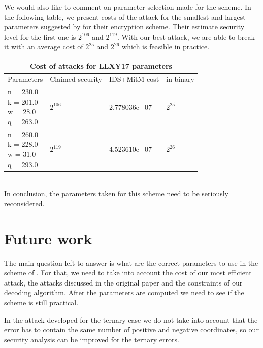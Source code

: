 \documentclass[12pt]{article}
\begin{document}
We would also like to comment on parameter selection made for the scheme. In the following table, we present costs of the attack for the smallest and largest parameters suggested by \cite{[LLXY17]} for their encryption scheme. Their estimate security level for the first one is $2^{106}$ and $2^{119}$. With our best attack, we are able to break it with an average cost of $2^{25}$ and $2^{26}$ which is feasible in practice. \\


\begin{tabular}{ |l||p{}|p{}|p{}| }
 \hline
 \multicolumn{4}{|c|}{Cost of attacks for LLXY17 parameters } \\
 \hline
 Parameters & Claimed security & IDS+MitM cost & in binary \\
 \hline
 \makecell{n = 230.0 \\ k = 201.0 \\ w = 28.0 \\ q = 263.0} & $2^{106}$ & 2.778036e+07 & $2^{25}$ \\
 \hline
 \makecell{n = 260.0 \\ k = 228.0 \\ w = 31.0 \\ q = 293.0} & $2^{119}$ & 4.523610e+07 & $2^{26}$ \\
 \hline
\end{tabular}
\\

In conclusion, the parameters taken for this scheme need to be seriously reconsidered.

\section{Future work}

The main question left to answer is what are the correct parameters to use in the scheme of \cite{[LLXY17]}. For that, we need to take into account the cost of our most efficient attack, the attacks discussed in the original paper and the constraints of our decoding algorithm. After the parameters are computed we need to see if the scheme is still practical.

In the attack developed for the ternary case we do not take into account that the error has to contain the same number of positive and negative coordinates, so our security analysis can be improved for the ternary errors.


\appendix
\end{document}
